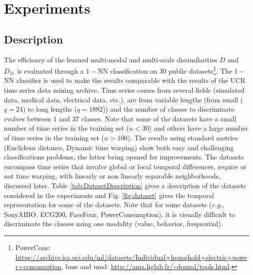 \chapter{Experiments}
\label{sec:unchapitre}
\minitoc


\section{Description}
The efficiency of the  learned multi-modal and multi-scale dissimilarities $D$ and $D_{\mathcal{H}}$ is evaluated through  a $1-$NN classification on 30 public datasets\footnote{PowerCons:   \url{https://archive.ics.uci.edu/ml/datasets/Individual+household+electric+power+consumption}, {\sc bme} and {\sc umd}:  \url{http://ama.liglab.fr/~douzal/tools.html}.}\cite{Keogh2011}. 
The $1-$NN classifier is used to make the results comparable with the results of the UCR time series data mining archive.
Time series comes from several fields (simulated data, medical data, electrical data, etc.), are from variable lengths (from small ($q=24$) to long lengths ($q=1882$)) and the number of classes to discriminate evolves between 1 and 37 classes. Note that some of the datasets have a small number of time series in the training set ($n < 30$) and others have a large number of time series in the training set ($n > 100$). The results using standard metrics (Euclidean distance, Dynamic time warping) show both easy and challenging classifications problems, the latter being opened for improvements. The datasets encompass time series that involve global or local temporal differences, require or not time warping, with  linearly or non linearly separable neighborhoods, discussed later. Table \ref{tab:DatasetDescription} gives a description of the datasets considered in the experiments and Fig. \ref{fig:dataset} gives the temporal representation for some of the datasets. Note that for some datasets (\textit{e.g.}, SonyAIBO, ECG200, FaceFour, PowerConsumption), it is visually difficult to  discriminate the classes using one modality (value, behavior, frequential).

